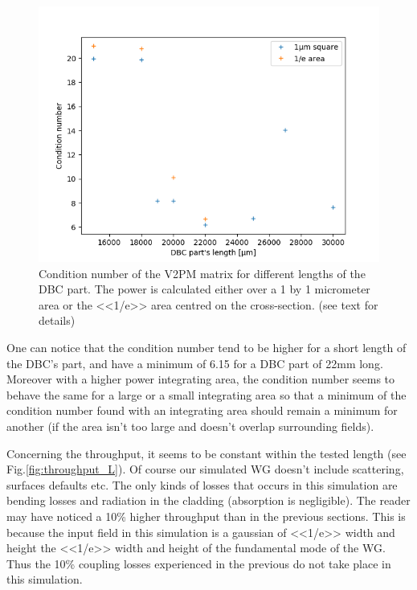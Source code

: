 \begin{figure}[htbp]
  \centering
  \includegraphics[scale=.5]{picture/geometry/CondNvsL.png}
  \caption{Condition number of the V2PM matrix for different lengths
    of the DBC part. The power is calculated either over a 1 by 1
    micrometer area or the <<1/e>> area centred on the
    cross-section. (see text for details)}
  \label{fig:length}
\end{figure}
One can notice that the condition number tend to be higher
for a short length of the DBC's part, and have a minimum of 6.15 for a
DBC part of 22mm
long. Moreover with a higher power integrating area, the condition number
seems to behave the same for a large or a small integrating area so
that a minimum of the condition number found with an integrating area
should remain a minimum for another (if the area isn't too large and
doesn't overlap surrounding fields).

Concerning the throughput, it seems to be constant within the tested
length (see Fig.\ref{fig:throughput_L}). Of course our simulated WG doesn't include scattering, surfaces defaults etc. The only kinds of losses that occurs
in this simulation are bending losses and
radiation in the cladding (absorption is negligible). The reader may have noticed a 10\% higher
throughput than in the previous sections. This is because the input
field in this simulation is a gaussian of <<1/e>> width and height the
<<1/e>> width and height of the fundamental mode of the WG. Thus the
10\% coupling losses experienced in the previous do not take place in
this simulation.

